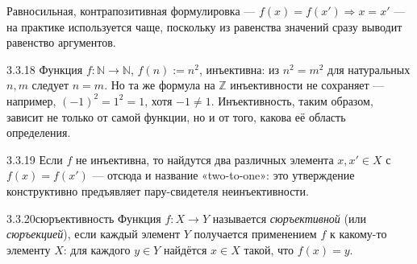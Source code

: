 \begin{remark}
Равносильная, контрапозитивная формулировка — $f(x)=f(x') \Rightarrow x=x'$ — на практике
используется чаще, поскольку из равенства значений сразу выводит равенство аргументов.
\end{remark}

\begin{example}{3.3.18}{}
Функция $f:\mathbb{N}\to\mathbb{N}$, $f(n):=n^2$, инъективна: из $n^2=m^2$ для натуральных
$n,m$ следует $n=m$. Но та же формула на $\mathbb{Z}$ инъективности не сохраняет — например,
$(-1)^2=1^2=1$, хотя $-1\neq1$. Инъективность, таким образом, зависит не только от самой
функции, но и от того, какова её область определения.
\end{example}

\begin{remarknum}{3.3.19}{}
Если $f$ не инъективна, то найдутся два различных элемента $x,x'\in X$ с $f(x)=f(x')$ —
отсюда и название «two-to-one»: это утверждение конструктивно предъявляет пару-свидетеля
неинъективности.
\end{remarknum}

\begin{definition}{3.3.20}{сюръективность}
Функция $f:X\to Y$ называется \emph{сюръективной} (или \emph{сюръекцией}), если каждый
элемент $Y$ получается применением $f$ к какому-то элементу $X$: для каждого $y\in Y$
найдётся $x\in X$ такой, что $f(x)=y$.
\end{definition}

